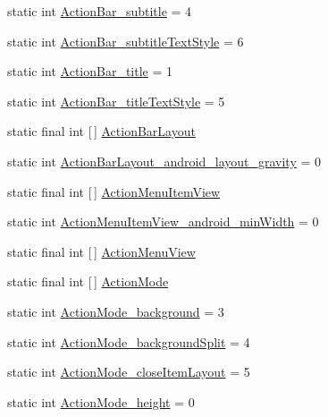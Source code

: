 \begin{DoxyCompactItemize}
\item 
static int \hyperlink{classandroid_1_1support_1_1v4_1_1R_1_1styleable_a1738ca6c1d0d6244db6783c6990e20a8}{Action\+Bar\+\_\+subtitle} = 4
\item 
static int \hyperlink{classandroid_1_1support_1_1v4_1_1R_1_1styleable_abd6b087231fbace7aa513febebda8b29}{Action\+Bar\+\_\+subtitle\+Text\+Style} = 6
\item 
static int \hyperlink{classandroid_1_1support_1_1v4_1_1R_1_1styleable_a342a7d8b0f7041ad4c7860c268da0784}{Action\+Bar\+\_\+title} = 1
\item 
static int \hyperlink{classandroid_1_1support_1_1v4_1_1R_1_1styleable_a185298c5a3c99e803809f41a523be2a6}{Action\+Bar\+\_\+title\+Text\+Style} = 5
\item 
static final int \mbox{[}$\,$\mbox{]} \hyperlink{classandroid_1_1support_1_1v4_1_1R_1_1styleable_a37ea3f1caf51d0b0a3db37a7ec954040}{Action\+Bar\+Layout}
\item 
static int \hyperlink{classandroid_1_1support_1_1v4_1_1R_1_1styleable_ac0ed4159880f534b9928b89eb5dd5eaa}{Action\+Bar\+Layout\+\_\+android\+\_\+layout\+\_\+gravity} = 0
\item 
static final int \mbox{[}$\,$\mbox{]} \hyperlink{classandroid_1_1support_1_1v4_1_1R_1_1styleable_a061b93f235efedcc9ec8af9ff1428785}{Action\+Menu\+Item\+View}
\item 
static int \hyperlink{classandroid_1_1support_1_1v4_1_1R_1_1styleable_ac2cec25459cc551c201c3e15e58b8c50}{Action\+Menu\+Item\+View\+\_\+android\+\_\+min\+Width} = 0
\item 
static final int \mbox{[}$\,$\mbox{]} \hyperlink{classandroid_1_1support_1_1v4_1_1R_1_1styleable_afa87b5affeb0d4df846452f171c47ce2}{Action\+Menu\+View}
\item 
static final int \mbox{[}$\,$\mbox{]} \hyperlink{classandroid_1_1support_1_1v4_1_1R_1_1styleable_abc7d063172fa73270c0ab8e5f7093972}{Action\+Mode}
\item 
static int \hyperlink{classandroid_1_1support_1_1v4_1_1R_1_1styleable_af8dfe84037d44a20d600812c83f8ae9f}{Action\+Mode\+\_\+background} = 3
\item 
static int \hyperlink{classandroid_1_1support_1_1v4_1_1R_1_1styleable_a094ac55778c3da81ee995f4d661dcdd3}{Action\+Mode\+\_\+background\+Split} = 4
\item 
static int \hyperlink{classandroid_1_1support_1_1v4_1_1R_1_1styleable_ac74559c17d14835068971c8a43ee0089}{Action\+Mode\+\_\+close\+Item\+Layout} = 5
\item 
static int \hyperlink{classandroid_1_1support_1_1v4_1_1R_1_1styleable_a4c33e09d0d28a0556eb95a6d8e79d430}{Action\+Mode\+\_\+height} = 0

\end{DoxyCompactItemize}
